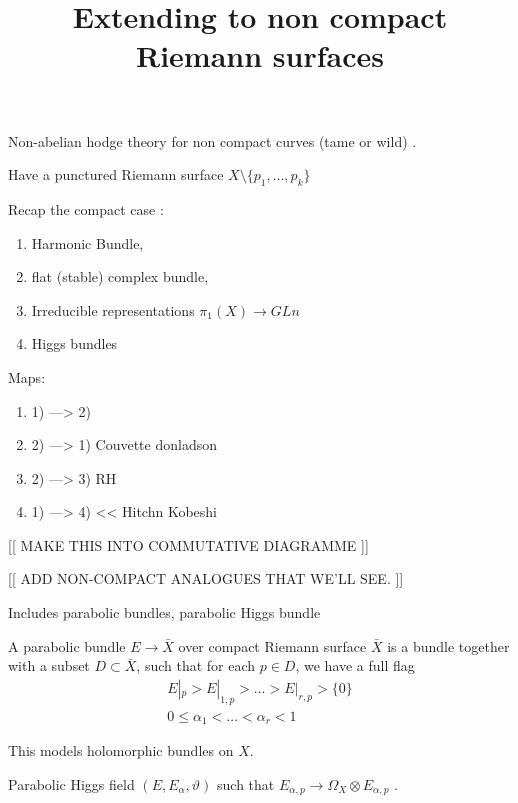 % 



\title{Extending to non compact Riemann surfaces}
\author{}
\date{}

 
\maketitle
Non-abelian hodge theory for non compact curves (tame or wild) .

Have a punctured Riemann surface $ X \setminus \{ p_1 , \dots, p_k \} $ 

Recap the compact case : 
\begin{enumerate}
    \item Harmonic Bundle, 
    \item flat (stable) complex bundle, 
    \item Irreducible representations $ \pi_1(X) \rightarrow GLn $ 
    \item Higgs bundles 
\end{enumerate}
Maps: 
\begin{enumerate}
    \item 1) ---> 2)
    \item 2) ---> 1) Couvette donladson 
    \item 2) ---> 3) RH 
    \item 1) ---> 4) << Hitchn Kobeshi 
\end{enumerate}

[[ MAKE THIS INTO COMMUTATIVE DIAGRAMME ]] 

[[ ADD  NON-COMPACT ANALOGUES THAT WE'LL SEE. ]]

Includes parabolic bundles, 
parabolic Higgs bundle 

\begin{definition}
    A parabolic bundle $ E \rightarrow \bar{X} $ over compact Riemann surface $ \bar{X}$ 
    is a bundle together with a subset $ D \subset \bar{X}$, 
    such that for each $p \in D$, we have a full flag 
    \begin{align}
        E|_p > E|_{1,p} > \dots > E|_{r , p } > \{ 0 \} \\
        0 \leq \alpha_ 1 < \dots < \alpha _r < 1
    \end{align}
\end{definition}

This models holomorphic bundles on $X$. 

Parabolic Higgs field $(E, E_\alpha , \vartheta) $ 
such that $ E_{\alpha , p } \rightarrow \Omega_X \otimes E_{\alpha, p} $ .

